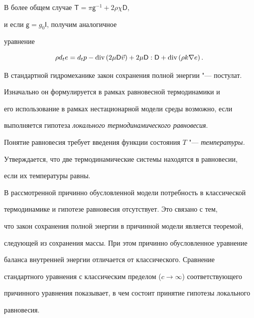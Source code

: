 В более общем случае $\mathsf{T}=\pi\mathsf{g}^{-1}+2\rho\chi\mathsf{D}$,

и\textsf{ }если \textsf{$\mathsf{g}=g_{0}\mathsf{I}$}, получим аналогичное

уравнение 

\begin{equation}

\rho d_{t}e=d_{t}p-\textnormal{div}\left(2\mu\mathsf{D}\vec{v}\right)+2\mu\mathsf{D}:\mathsf{D}+\textnormal{div}\left(\rho k\nabla e\right).\label{eq:4D_Int}

\end{equation}



\smallskip




В стандартной гидромеханике закон сохранения полной энергии "---  постулат.

Изначально он формулируется в рамках равновесной термодинамики и

его использование в рамках нестационарной модели среды возможно, если

выполняется гипотеза \emph{локального термодинамического равновесия}.

Понятие равновесия требует введения функции состояния $T$ "---  \emph{температуры.}

Утверждается, что две термодинамические системы находятся в равновесии,

если их температуры равны. 



В рассмотренной причинно обусловленной модели потребность в классической

термодинамике и гипотезе равновесия отсутствует. Это связано с тем,

что закон сохранения полной энергии в причинной модели является теоремой,

следующей из сохранения массы. При этом причинно обусловленное уравнение

баланса внутренней энергии отличается от классического. Сравнение

стандартного уравнения с классическим пределом ($c\to\infty$) соответствующего

причинного уравнения показывает, в чем состоит принятие гипотезы локального

равновесия.



